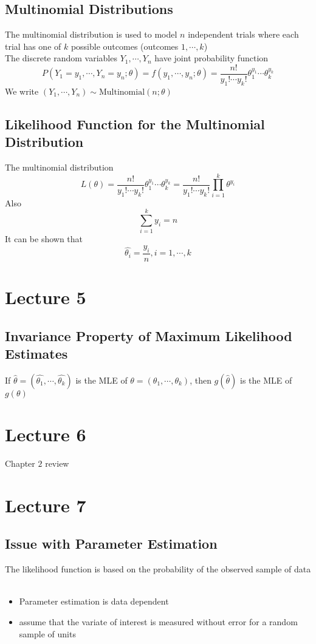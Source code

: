 \documentclass[11pt]{article}
\begin{document}
\subsection{Multinomial Distributions}
The multinomial distribution is used to model $n$ independent trials where each trial has one of $k$ possible outcomes (outcomes $1,\cdots,k$) \\
The discrete random variables $Y_1,\cdots, Y_n$ have joint probability function 
\[P(Y_1=y_1,\cdots, Y_n=y_n; \theta) = f(y_1,\cdots,y_n;\theta) = \dfrac{n!}{y_1!\cdots y_k!}\theta_1^{y_1}\cdots\theta_k^{y_k}\]
We write $(Y_1,\cdots,Y_n)\sim\text{Multinomial}(n;\theta)$
\subsection{Likelihood Function for the Multinomial Distribution}
The multinomial distribution 
\[L(\theta) = \dfrac{n!}{y_1!\cdots y_k!}\theta_1^{y_1}\cdots\theta_k^{y_k}=\dfrac{n!}{y_1!\cdots y_k!}\prod_{i=1}^k\theta^{y_i}\]
Also 
\[\sum_{i=1}^{k}y_i = n\]
It can be shown that 
\[\hat{\theta_i} = \frac{y_i}{n}, i= 1,\cdots,k\]

\section{Lecture 5}
\subsection{Invariance Property of Maximum Likelihood Estimates}
If $\hat{\theta} = (\hat{\theta_1},\cdots,\hat{\theta_k})$ is the MLE of $\theta = (\theta_1,\cdots,\theta_k)$, then $g(\hat{\theta})$ is the MLE of $g(\theta)$

\section{Lecture 6}
Chapter $2$ review

\section{Lecture 7}
\subsection{Issue with Parameter Estimation}
The likelihood function is based on the probability of the observed sample of data \
\begin{itemize}
  \item Parameter estimation is data dependent 
  \item assume that the variate of interest is measured without error for a random sample of units 
\end{itemize}
\end{document}
